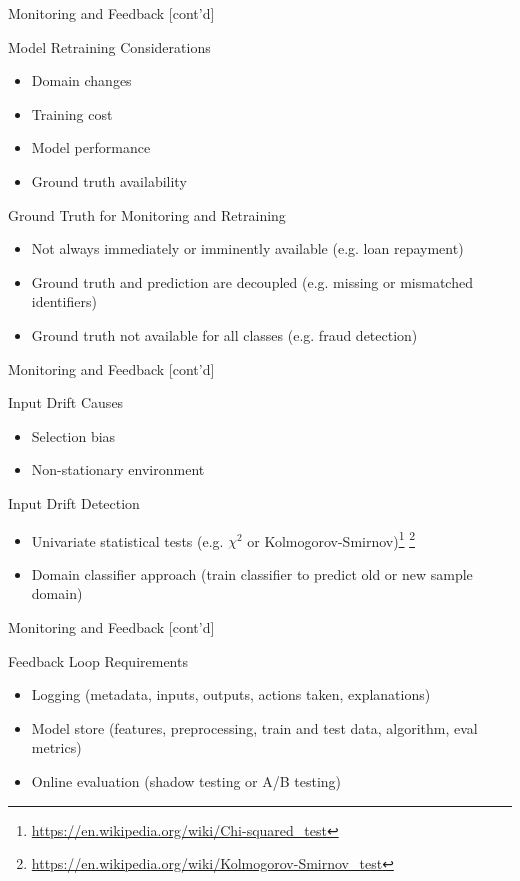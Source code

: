 \documentclass[ignorenonframetext,xcolor=x11names]{beamer}
\begin{document}
\begin{frame}{Monitoring and Feedback \small [cont'd]}
\begin{block}{Model Retraining Considerations}
\begin{itemize}
   \item Domain changes
   \item Training cost
   \item Model performance
   \item Ground truth availability
\end{itemize}
\end{block}
\begin{block}{Ground Truth for Monitoring and Retraining}
\begin{itemize}
   \item Not always immediately or imminently available (e.g. loan repayment)
   \item Ground truth and prediction are decoupled (e.g. missing or mismatched identifiers)
   \item Ground truth not available for all classes (e.g. fraud detection)
\end{itemize}
\end{block}
\end{frame}

\begin{frame}{Monitoring and Feedback \small [cont'd]}
\begin{block}{Input Drift Causes}
\begin{itemize}
   \item Selection bias
   \item Non-stationary environment
\end{itemize}
\end{block}
\begin{block}{Input Drift Detection}
\begin{itemize}
   \item Univariate statistical tests (e.g. $\chi^2$ or Kolmogorov-Smirnov)\footnote{\url{https://en.wikipedia.org/wiki/Chi-squared_test}} \footnote{\url{https://en.wikipedia.org/wiki/Kolmogorov-Smirnov_test}}
   \item Domain classifier approach (train classifier to predict old or new sample domain)
\end{itemize}
\end{block}
\end{frame}

\begin{frame}{Monitoring and Feedback \small [cont'd]}
\begin{block}{Feedback Loop Requirements}
\begin{itemize}
   \item Logging (metadata, inputs, outputs, actions taken, explanations)
   \item Model store (features, preprocessing, train and test data, algorithm, eval metrics)
   \item Online evaluation (shadow testing or A/B testing)
\end{itemize}
\end{block}
\end{frame}
\end{document}
